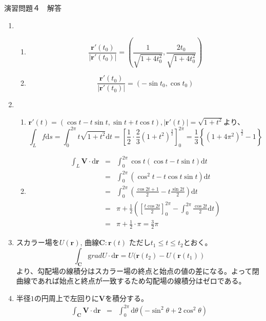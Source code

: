 \documentclass{jarticle}
\def\d{\mathrm d}
\def\grad{\mathrm grad}
\begin{document}
\newpage

\begin{center} {\Large 演習問題４　解答} \end{center}
  \begin{enumerate}
    \item
      \begin{enumerate}
        \item
          \[\frac {\bm r'(t_0)}{|\bm r'(t_0)|} = (\frac{1}{\sqrt{1+4t_0^2}}, \frac{2t_0}{\sqrt{1+4t_0^2}})\]
        \item
          \[\frac {\bm r'(t_0)}{|\bm r'(t_0)|} = (-\sin t_0, \cos t_0) \]
      \end{enumerate}
    \item
      \begin{enumerate}
        \item
          $\bm r'(t) = (\cos t - t \sin t, \sin t + t \cos t),|\bm r'(t)| = \sqrt{1+t^2}$より、
          \[ \int_L f \d s = \int_0^{2\pi} t \sqrt{1+t^2} \d t = \left[ \frac{1}{2} \cdot \frac{2}{3}  (1+t^2)^\frac{3}{2} \right]_0^{2\pi} = \frac{1}{3} \left\{ (1+4\pi^2)^\frac{3}{2} - 1 \right\} \]
        \item
          \begin{eqnarray*} 
            \int_L \bm V \cdot \d \bm{r} & = & \int_0^{2\pi} \cos t ( \cos t - t \sin t ) \d t \\
            & = & \int_0^{2\pi} ( \cos^2 t - t \cos t \sin t ) \d t  \\
            & = & \int_0^{2\pi} \left( \frac{\cos 2t + 1}{2} - t \frac{\sin 2t}{2} \right) \d t \\
            & = & \pi + \frac{1}{2} \left( \left[ \frac{t \cos 2t}{2} \right]_0^{2\pi} - \int_0^{2\pi} \frac{\cos 2t}{2} \d t \right)\\
            & = &  \pi + \frac{1}{2} \cdot \pi = \frac{3}{2} \pi 
          \end{eqnarray*}
      \end{enumerate}
    \item
      スカラー場を$U(\bm r)$, 曲線$\bm C: \bm r(t)$ ただし$t_1 \leq t \leq t_2$とおく。
      \[ \int_{\bm C} \grad U \cdot \d \bm{r}  = U(\bm r(t_2) - U(\bm r(t_1)) \]
      より、勾配場の線積分はスカラー場の終点と始点の値の差になる。よって閉曲線であれば始点と終点が一致するため勾配場の線積分はゼロである。
    \item
      半径$1$の円周上で左回りに$\bm V$を積分する。
      \begin{eqnarray*} 
        \int_{\bm C} \bm V \cdot \d \bm r & = & \int_0^{2\pi} \d \theta ( - \sin^2 \theta + 2 \cos^2 \theta ) \\

\end{eqnarray*}
\end{enumerate}
\end{document}
